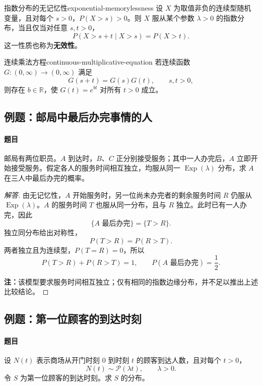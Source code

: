 \begin{mytheorem}{指数分布的无记忆性}{exponential-memorylessness}
设 $X$ 为取值非负的连续型随机变量，且对每个 $s>0$，$P(X>s)>0$。则 $X$ 服从某个参数 $\lambda>0$ 的指数分布，当且仅当对任意 $s,t>0$，
\[
P(X>s+t\mid X>s)=P(X>t).
\]
这一性质也称为\textbf{无效性}。
\end{mytheorem}

\begin{mylemma}{连续乘法方程}{continuous-multiplicative-equation}
若连续函数 $G:(0,\infty)\to(0,\infty)$ 满足
\[
G(s+t)=G(s)G(t),\qquad s,t>0,
\]
则存在 $b\in\mathbb R$，使 $G(t)=e^{bt}$ 对所有 $t>0$ 成立。
\end{mylemma}

\subsection{例题：邮局中最后办完事情的人}\label{note:c2:e14}
\paragraph{题目}
邮局有两位职员。$A$ 到达时，$B$、$C$ 正分别接受服务；其中一人办完后，$A$ 立即开始接受服务。假定各人的服务时间相互独立，均服从同一 $\operatorname{Exp}(\lambda)$ 分布，求 $A$ 在三人中最后办完的概率。

\begin{proof}[解答]
由无记忆性，$A$ 开始服务时，另一位尚未办完者的剩余服务时间 $R$ 仍服从 $\operatorname{Exp}(\lambda)$。$A$ 的服务时间 $T$ 也服从同一分布，且与 $R$ 独立。此时已有一人办完，因此
\[
\{A\text{ 最后办完}\}=\{T>R\}.
\]
独立同分布给出对称性，
\[
P(T>R)=P(R>T).
\]
两者独立且为连续型，$P(T=R)=0$，所以
\[
P(T>R)+P(R>T)=1,
\qquad
P(A\text{ 最后办完})=\frac12.
\]

\textbf{注：}\quad 该模型要求服务时间相互独立；仅有相同的指数边缘分布，并不足以推出上述比较结论。
\end{proof}

\subsection{例题：第一位顾客的到达时刻}\label{note:c2:e15}
\paragraph{题目}
设 $N(t)$ 表示商场从开门时刻 $0$ 到时刻 $t$ 的顾客到达人数，且对每个 $t>0$，
\[
N(t)\sim\mathcal P(\lambda t),\qquad \lambda>0.
\]
令 $S$ 为第一位顾客的到达时刻。求 $S$ 的分布。

